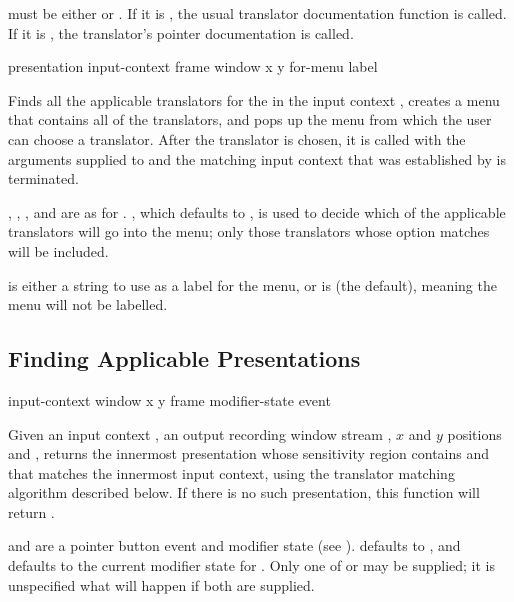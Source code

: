  must be either  or .  If it is
, the usual translator documentation function is called.  If it is
, the translator's pointer documentation is called.


 {presentation input-context frame window x y
                                 \key for-menu label}

Finds all the applicable translators for the 
 in the input context , creates a menu that
contains all of the translators, and pops up the menu from which the user can
choose a translator.  After the translator is chosen, it is called with the
arguments supplied to  and the matching input context
that was established by  is terminated.

, , , and  are as for
.  , which defaults to , is
used to decide which of the applicable translators will go into the menu; only
those translators whose  option matches  will be included.

 is either a string to use as a label for the menu, or is 
(the default), meaning the menu will not be labelled.


\subsection {Finding Applicable Presentations}

 {input-context window x y
                                                 \key frame modifier-state event}

Given an input context , an output recording window stream
, $x$ and $y$ positions  and , returns the innermost
presentation whose sensitivity region contains  and  that matches
the innermost input context, using the translator matching algorithm described
below.  If there is no such presentation, this function will return .

 and  are a pointer button event and modifier
state (see ).   defaults to ,
and  defaults to the current modifier state for
.  Only one of  or  may be supplied;
it is unspecified what will happen if both are supplied.

